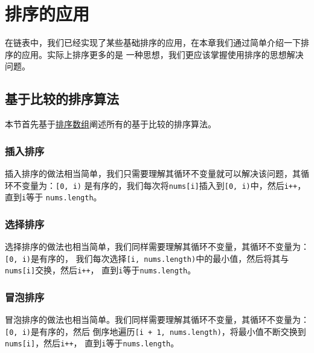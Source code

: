 \documentclass[../../main.tex]{subfiles}
\begin{document}
\setchapterpreamble[u]{\margintoc}

\chapter{排序的应用}

在链表中，我们已经实现了某些基础排序的应用，在本章我们通过简单介绍一下排序的应用。实际上排序更多的是
一种思想，我们更应该掌握使用排序的思想解决问题。

\section{基于比较的排序算法}

本节首先基于\href{https://leetcode.cn/problems/sort-an-array/}{排序数组}阐述所有的基于比较的排序算法。

\subsection{插入排序}

插入排序的做法相当简单，我们只需要理解其循环不变量就可以解决该问题，其循环不变量为：\texttt{[0, i)}
是有序的，我们每次将\texttt{nums[i]}插入到\texttt{[0, i)}中，然后\texttt{i++}，直到\texttt{i}等于
\texttt{nums.length}。



\subsection{选择排序}

选择排序的做法也相当简单，我们同样需要理解其循环不变量，其循环不变量为：\texttt{[0, i)}是有序的，
我们每次选择\texttt{[i, nums.length)}中的最小值，然后将其与\texttt{nums[i]}交换，然后\texttt{i++}，
直到\texttt{i}等于\texttt{nums.length}。



\subsection{冒泡排序}

冒泡排序的做法也相当简单。我们同样需要理解其循环不变量，其循环不变量为：\texttt{[0, i)}是有序的，然后
倒序地遍历\texttt{[i + 1, nums.length)}，将最小值不断交换到\texttt{nums[i]}，然后\texttt{i++}，
直到\texttt{i}等于\texttt{nums.length}。


\end{document}

